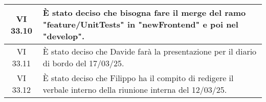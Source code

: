 \begin{table}[htbp]
\begin{tabular}{|c|p{}|}
        \hline
        VI 33.10 & È stato deciso che bisogna fare il merge del ramo "feature/UnitTests" in "newFrontend" e poi nel "develop".\\
        \hline
        VI 33.11 & È stato deciso che Davide farà la presentazione per il diario di bordo del 17/03/25.\\
        \hline
        VI 33.12 & È stato deciso che Filippo ha il compito di redigere il verbale interno della riunione interna del 12/03/25.\\
        \hline
    \end{tabular}
\end{table}
